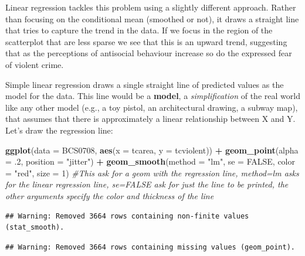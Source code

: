 \documentclass[]{book}
\newenvironment{Shaded}{\begin{snugshade}}{\end{snugshade}}
\newcommand{\CommentTok}[1]{\textcolor[rgb]{0.56,0.35,0.01}{\textit{#1}}}
\newcommand{\DataTypeTok}[1]{\textcolor[rgb]{0.13,0.29,0.53}{#1}}
\newcommand{\DecValTok}[1]{\textcolor[rgb]{0.00,0.00,0.81}{#1}}
\newcommand{\FloatTok}[1]{\textcolor[rgb]{0.00,0.00,0.81}{#1}}
\newcommand{\KeywordTok}[1]{\textcolor[rgb]{0.13,0.29,0.53}{\textbf{#1}}}
\newcommand{\NormalTok}[1]{#1}
\newcommand{\OperatorTok}[1]{\textcolor[rgb]{0.81,0.36,0.00}{\textbf{#1}}}
\newcommand{\OtherTok}[1]{\textcolor[rgb]{0.56,0.35,0.01}{#1}}
\newcommand{\StringTok}[1]{\textcolor[rgb]{0.31,0.60,0.02}{#1}}
\theoremstyle{definition}
\theoremstyle{definition}
\theoremstyle{definition}
\theoremstyle{remark}
\begin{document}
Linear regression tackles this problem using a slightly different
approach. Rather than focusing on the conditional mean (smoothed or
not), it draws a straight line that tries to capture the trend in the
data. If we focus in the region of the scatterplot that are less sparse
we see that this is an upward trend, suggesting that as the perceptions
of antisocial behaviour increase so do the expressed fear of violent
crime.

Simple linear regression draws a single straight line of predicted
values as the model for the data. This line would be a \textbf{model}, a
\emph{simplification} of the real world like any other model (e.g., a
toy pistol, an architectural drawing, a subway map), that assumes that
there is approximately a linear relationship between X and Y. Let's draw
the regression line:

\begin{Shaded}
\begin{Highlighting}[]
\KeywordTok{ggplot}\NormalTok{(}\DataTypeTok{data =}\NormalTok{ BCS0708, }\KeywordTok{aes}\NormalTok{(}\DataTypeTok{x =}\NormalTok{ tcarea, }\DataTypeTok{y =}\NormalTok{ tcviolent)) }\OperatorTok{+}
\StringTok{  }\KeywordTok{geom_point}\NormalTok{(}\DataTypeTok{alpha =} \FloatTok{.2}\NormalTok{, }\DataTypeTok{position =} \StringTok{"jitter"}\NormalTok{) }\OperatorTok{+}
\StringTok{  }\KeywordTok{geom_smooth}\NormalTok{(}\DataTypeTok{method =} \StringTok{"lm"}\NormalTok{, }\DataTypeTok{se =} \OtherTok{FALSE}\NormalTok{, }\DataTypeTok{color =} \StringTok{"red"}\NormalTok{, }\DataTypeTok{size =} \DecValTok{1}\NormalTok{) }\CommentTok{#This ask for a geom with the regression line, method=lm asks for the linear regression line, se=FALSE ask for just the line to be printed, the other arguments specify the color and thickness of the line}
\end{Highlighting}
\end{Shaded}

\begin{verbatim}
## Warning: Removed 3664 rows containing non-finite values (stat_smooth).
\end{verbatim}

\begin{verbatim}
## Warning: Removed 3664 rows containing missing values (geom_point).
\end{verbatim}
\end{document}

